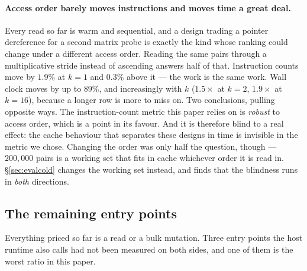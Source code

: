 \documentclass[11pt,a4paper]{article}
\theoremstyle{plain}
\theoremstyle{definition}
\theoremstyle{remark}
\begin{document}
\paragraph{Access order barely moves instructions and moves time a great deal.}
Every read so far is warm and sequential, and a design trading a pointer
dereference for a second matrix probe is exactly the kind whose ranking could
change under a different access order. Reading the same
pairs through a multiplicative stride instead of ascending answers half of that.
Instruction counts move by $1.9\%$ at $k = 1$ and $0.3\%$ above it --- the work
is the same work. Wall clock moves by up to $89\%$, and increasingly with $k$
($1.5\times$ at $k=2$, $1.9\times$ at $k=16$), because a longer row is more to
miss on. Two conclusions, pulling opposite ways. The instruction-count metric
this paper relies on is \emph{robust} to access order, which is a point in its
favour. And it is therefore blind to a real
effect: the cache behaviour that separates these designs in time is invisible in
the metric we chose. Changing the order was only half the question, though ---
$200{,}000$ pairs is a working set that fits in cache whichever order it is read
in. \S\ref{sec:evalcold} changes the working set instead, and finds that the
blindness runs in \emph{both} directions.

\subsection{The remaining entry points}
\label{sec:evalentry}

Everything priced so far is a read or a bulk mutation. Three entry points the
host runtime also calls had not been measured on both sides, and one of them is
the worst ratio in this paper.
\end{document}
